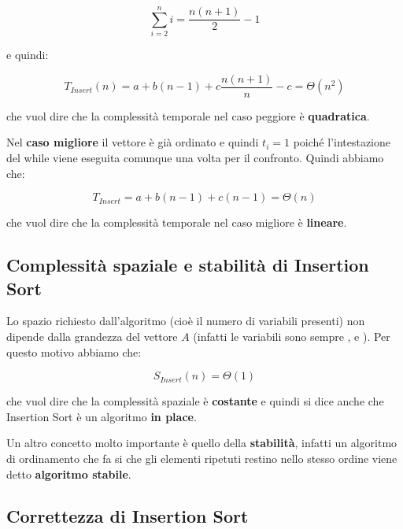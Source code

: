 \begin{flushleft}
\[ \sum_{i = 2}^{n} i = \frac {n (n+1)} {2} - 1 \]

e quindi:

\[ T_{Insert}(n) = a + b(n-1) + c \frac{n (n+1)}{n} - c = \Theta(n^2)\]

che vuol dire che la complessità temporale nel caso peggiore è \textbf{quadratica}.

\medskip

Nel \textbf{caso migliore} il vettore è già ordinato e quindi $t_i = 1$ poiché l'intestazione del while
viene eseguita comunque una volta per il confronto. Quindi abbiamo che:

\[ T_{Insert} = a + b(n-1) + c(n-1) = \Theta(n) \]

che vuol dire che la complessità temporale nel caso migliore è \textbf{lineare}.

\end{flushleft}

\subsection{Complessità spaziale e stabilità di Insertion Sort}

\begin{flushleft}

Lo spazio richiesto dall'algoritmo (cioè il numero di variabili presenti) non dipende dalla grandezza del
vettore $A$ (infatti le variabili sono sempre ,  e ). Per questo 
motivo abbiamo che:

\[ S_{Insert}(n) = \Theta(1)\]

che vuol dire che la complessità spaziale è \textbf{costante} e quindi si dice anche che Insertion Sort è un
algoritmo \textbf{in place}.

\bigskip

Un altro concetto molto importante è quello della \textbf{stabilità}, infatti un algoritmo di ordinamento
che fa si che gli elementi ripetuti restino nello stesso ordine viene detto \textbf{algoritmo stabile}.

\end{flushleft}

\subsection{Correttezza di Insertion Sort}

